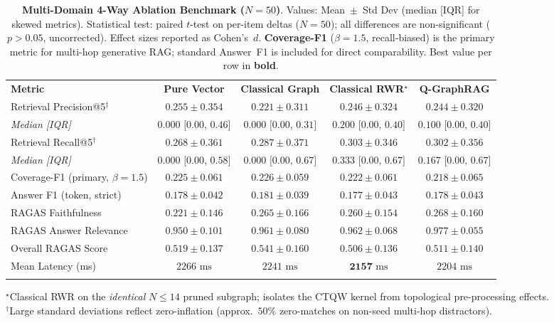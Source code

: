 \documentclass{llncs}
\begin{document}
\begin{table}[t]
\centering
\small
\caption{\textbf{Multi-Domain 4-Way Ablation Benchmark ($N=50$)}. Values: Mean~$\pm$~Std Dev (median [IQR] for skewed metrics). Statistical test: paired $t$-test on per-item deltas ($N=50$); all differences are non-significant ($p>0.05$, uncorrected). Effect sizes reported as Cohen's~$d$. \textbf{Coverage-F1} ($\beta=1.5$, recall-biased) is the primary metric for multi-hop generative RAG; standard Answer~F1 is included for direct comparability. Best value per row in \textbf{bold}.}
\label{tab:benchmark_50_results}
\begin{tabular}{lcccc}
\hline\noalign{\smallskip}
\textbf{Metric} & \textbf{Pure Vector} & \textbf{Classical Graph} & \textbf{Classical RWR$^\star$} & \textbf{Q-GraphRAG} \\
\noalign{\smallskip}\hline\noalign{\smallskip}
Retrieval Precision@5$^\dagger$   & $\mathbf{0.255}\pm0.354$ & $0.221\pm0.311$ & $0.246\pm0.324$ & $0.244\pm0.320$ \\
\quad \textit{Median [IQR]}       & $0.000\text{ [0.00, 0.46]}$ & $0.000\text{ [0.00, 0.31]}$ & $0.200\text{ [0.00, 0.40]}$ & $0.100\text{ [0.00, 0.40]}$ \\
Retrieval Recall@5$^\dagger$      & $0.268\pm0.361$ & $0.287\pm0.371$ & $\mathbf{0.303}\pm0.346$ & $0.302\pm0.356$ \\
\quad \textit{Median [IQR]}       & $0.000\text{ [0.00, 0.58]}$ & $0.000\text{ [0.00, 0.67]}$ & $0.333\text{ [0.00, 0.67]}$ & $0.167\text{ [0.00, 0.67]}$ \\
\noalign{\smallskip}\hline\noalign{\smallskip}
Coverage-F1 (primary, $\beta=1.5$) & $\mathbf{0.225}\pm0.061$ & $\mathbf{0.226}\pm0.059$ & $0.222\pm0.061$ & $0.218\pm0.065$ \\
Answer F1 (token, strict) & $0.178\pm0.042$ & $\mathbf{0.181}\pm0.039$ & $0.177\pm0.043$ & $0.178\pm0.043$ \\
\noalign{\smallskip}\hline\noalign{\smallskip}
RAGAS Faithfulness      & $0.221\pm0.146$ & $0.265\pm0.166$ & $0.260\pm0.154$ & $\mathbf{0.268}\pm0.160$ \\
RAGAS Answer Relevance  & $0.950\pm0.101$ & $0.961\pm0.080$ & $0.962\pm0.068$ & $\mathbf{0.977}\pm0.055$ \\
Overall RAGAS Score     & $0.519\pm0.137$ & $\mathbf{0.541}\pm0.160$ & $0.506\pm0.136$ & $0.511\pm0.140$ \\
\noalign{\smallskip}\hline\noalign{\smallskip}
Mean Latency (ms)       & $2266\text{ ms}$ & $2241\text{ ms}$ & $\mathbf{2157}\text{ ms}$ & $2204\text{ ms}$ \\
\noalign{\smallskip}\hline
\end{tabular}
\vspace{2pt}
\noindent\small$^\star$Classical RWR on the \emph{identical} $N\leq14$ pruned subgraph; isolates the CTQW kernel from topological pre-processing effects.\\
$^\dagger$Large standard deviations reflect zero-inflation (approx.\ $50\%$ zero-matches on non-seed multi-hop distractors).
\end{table}
\end{document}
